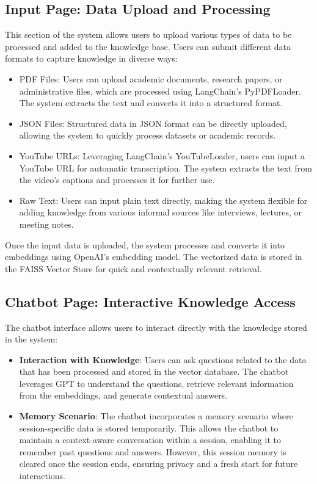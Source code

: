 \documentclass[runningheads]{llncs}
\begin{document}
\subsection{Input Page: Data Upload and Processing}
This section of the system allows users to upload various types of data to be processed and added to the knowledge base. Users can submit different data formats to capture knowledge in diverse ways:
\begin{itemize}
    \item PDF Files: Users can upload academic documents, research papers, or administrative files, which are processed using LangChain's PyPDFLoader. The system extracts the text and converts it into a structured format.
    \item JSON Files: Structured data in JSON format can be directly uploaded, allowing the system to quickly process datasets or academic records.
    \item YouTube URLs: Leveraging LangChain's YouTubeLoader, users can input a YouTube URL for automatic transcription. The system extracts the text from the video's captions and processes it for further use.
    \item Raw Text: Users can input plain text directly, making the system flexible for adding knowledge from various informal sources like interviews, lectures, or meeting notes.
\end{itemize}

Once the input data is uploaded, the system processes and converts it into embeddings using OpenAI's embedding model. The vectorized data is stored in the FAISS Vector Store for quick and contextually relevant retrieval.

\subsection{Chatbot Page: Interactive Knowledge Access}
The chatbot interface allows users to interact directly with the knowledge stored in the system:
\begin{itemize}
    \item \textbf{Interaction with Knowledge}: Users can ask questions related to the data that has been processed and stored in the vector database. The chatbot leverages GPT to understand the questions, retrieve relevant information from the embeddings, and generate contextual answers.
    \item \textbf{Memory Scenario}: The chatbot incorporates a memory scenario where session-specific data is stored temporarily. This allows the chatbot to maintain a context-aware conversation within a session, enabling it to remember past questions and answers. However, this session memory is cleared once the session ends, ensuring privacy and a fresh start for future interactions.
\end{itemize}
\end{document}
